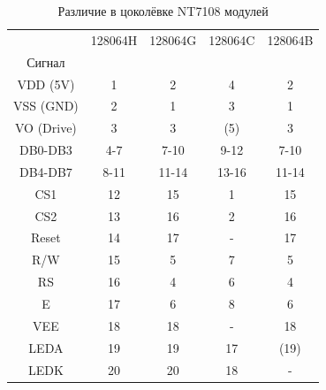 \begin{table}[H]
  \begin{center}
    \begin{tabular}{| c || c | c | c | c |}
    \hline
           & 128064H  &  128064G  & 128064C  & 128064B \\
    Сигнал &         &          &         &         \\
    \hline
    \hline
  VDD (5V) &   1     &  2       &   4     & 2       \\
    \hline
  VSS (GND) &   2     &  1       &   3     & 1       \\
    \hline
 VO (Drive) &   3     &  3       &  (5)    & 3       \\
    \hline
  DB0-DB3   &   4-7   &  7-10    &   9-12  & 7-10    \\
    \hline
  DB4-DB7   &   8-11  &  11-14   &   13-16 & 11-14   \\
    \hline
  CS1       &   12    &  15      &   1     & 15      \\
  CS2       &   13    &  16      &   2     & 16      \\
    \hline
  Reset     &   14    &  17      &   -     & 17      \\
    \hline
  R/W       &   15    &  5       &   7     & 5       \\
    \hline
  RS        &   16    &  4       &   6     & 4       \\
    \hline
  E         &   17    &  6       &   8     & 6       \\
    \hline
  VEE       &   18    &  18      &   -     & 18      \\
    \hline
  LEDA      &   19    &  19      &   17    & (19)      \\
  LEDK      &   20    &  20      &   18    & -      \\
    \hline
    \end{tabular}
  \end{center}
  \caption{Различие в цоколёвке NT7108 модулей}
  \label{tab:NT7108types}
\end{table}

